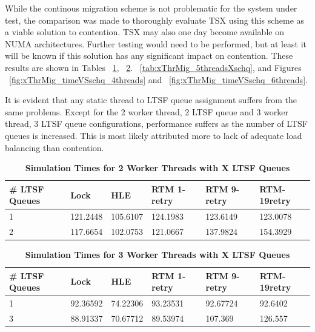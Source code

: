 \documentclass[11pt]{book}
\begin{document}
While the continous migration scheme is not problematic for the system under
test, the comparison was made to thoroughly evaluate TSX using this scheme as a
viable solution to contention.  TSX may also one day become available on NUMA
architectures.  Further testing would need to be performed, but at least it will
be known if this solution has any significant impact on contention.  These
results are shown in Tables ~\ref{tab:xThrMig_2threadsXschq},
~\ref{tab:xThrMig_3threadsXschq}.  ~\ref{tab:xThrMig_5threadsXschq}, and Figures
~\ref{fig:xThrMig_timeVSschq_4threads} and
~\ref{fig:xThrMig_timeVSschq_6threads}.

It is evident that any static thread to LTSF queue assignment suffers from the
same problems.  Except for the 2 worker thread, 2 LTSF queue and 3 worker
thread, 3 LTSF queue configurations, performance suffers as the number of LTSF
queues is increased.  This is most likely attributed more to lack of adequate
load balancing than contention.

\begin{table}[H]
    \centering
    \begin{tabular}{l|p{2cm}|p{2cm}|p{2cm}|p{2cm}|p{2cm}}
        \textbf{\# LTSF Queues}&Lock &HLE &RTM 1-retry &RTM 9-retry &RTM-19retry \\
        \hline
        \midrule
            1 &121.2448  &105.6107 &124.1983  &123.6149 &123.0078 \\ 
            2 &117.6654  &102.0753 &121.0667  &137.9824 &154.3929 \\
    \end{tabular}
    \caption{\textbf{Simulation Times for 2 Worker Threads with X LTSF Queues}}
    \label{tab:xThrMig_2threadsXschq}
\end{table}

\begin{table}[H]
    \centering
    \begin{tabular}{l|p{2cm}|p{2cm}|p{2cm}|p{2cm}|p{2cm}}
        \textbf{\# LTSF Queues}&Lock &HLE &RTM 1-retry &RTM 9-retry &RTM-19retry \\
        \hline
        \midrule
            1 &92.36592  &74.22306 &93.23531  &92.67724 &92.6402 \\ 
            3 &88.91337  &70.67712 &89.53974  &107.369  &126.557 \\
    \end{tabular}
    \caption{\textbf{Simulation Times for 3 Worker Threads with X LTSF Queues}}
    \label{tab:xThrMig_3threadsXschq}
\end{table}
\end{document}
